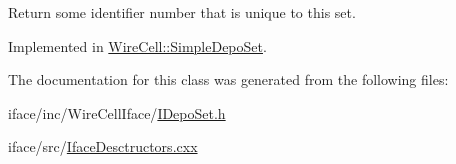 Return some identifier number that is unique to this set. 



Implemented in \hyperlink{class_wire_cell_1_1_simple_depo_set_a1b5301daed3b2e8981994e7218be1d35}{Wire\+Cell\+::\+Simple\+Depo\+Set}.



The documentation for this class was generated from the following files\+:\begin{DoxyCompactItemize}
\item 
iface/inc/\+Wire\+Cell\+Iface/\hyperlink{_i_depo_set_8h}{I\+Depo\+Set.\+h}\item 
iface/src/\hyperlink{_iface_desctructors_8cxx}{Iface\+Desctructors.\+cxx}\end{DoxyCompactItemize}

